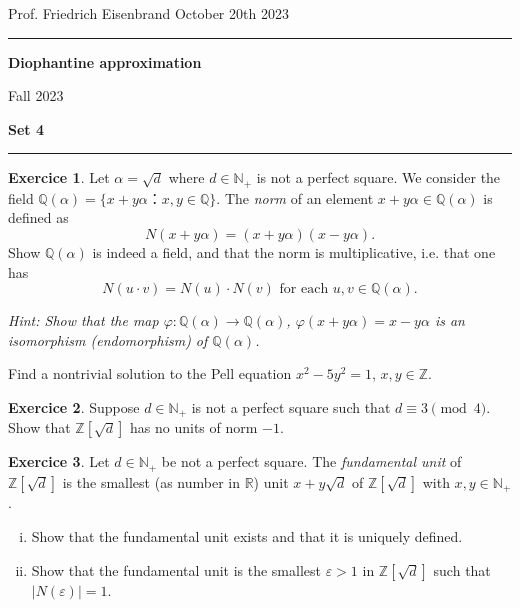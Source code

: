 \documentclass[12pt,a4paper]{article}
\date{}
\theoremstyle{plain}
\newtheorem*{Sol*}{Solution}
\theoremstyle{definition}
\newtheorem{Ex}{Exercice}
\def \Q {\mathbb Q}
\newif\ifsolutions
\newcommand{\exercise}[2]{
			\begin{Ex} #1 \end{Ex}
			\ifsolutions  \begin{Sol*} #2 \end{Sol*} \bigskip \else \bigskip  \fi
		}
\begin{document}
\begin{center}
{Prof. Friedrich Eisenbrand \hfill October 20th 2023}
\end{center}
	
\hrule\vspace{\baselineskip}

\begin{center}
\textbf{Diophantine approximation}

Fall 2023

\bigskip

\textbf{Set 4}
\ifsolutions{\textbf{- Solutions}} \else{} \fi
\end{center}

\hrule\vspace{\baselineskip}



\exercise{ Let $α = \sqrt{d}$ where $d ∈ ℕ_+$ is not a perfect square. We consider the field $ℚ(α) = \{ x + y α ： x, y ∈ℚ \}$.  The \emph{norm} of an element $x +  y α ∈ ℚ(α)$ is defined as
  \begin{displaymath}
    N(x +  y α) = (x +  y α)(x -  y α). 
  \end{displaymath}
  Show $\Q(\alpha)$ is indeed a field, and that the norm is multiplicative, i.e. that one has
  \begin{displaymath}
    N(u⋅v) = N(u)⋅N(v) \text{ for each } u,v ∈ℚ(α). 
  \end{displaymath}

{\bigskip \noindent  \small \emph{ Hint: Show that the map $φ: ℚ(α) → ℚ(α)$, $φ( x + y α ) =  x - y α $ is an isomorphism (endomorphism) of $ℚ(α)$.} }
}


\exercise{Find a nontrivial  solution to the Pell equation $x^2 - 5 y^2 =1$, $x,y ∈ ℤ$.}{}

\exercise{Suppose $d ∈ℕ_+$ is not a perfect square such that $d ≡ 3 \pmod{4}$. Show that $ℤ[\sqrt{d}]$ has no units of norm $-1$. }{}


\exercise{Let $d ∈ ℕ_+$ be not a perfect square. The \emph{fundamental unit} of $ℤ[\sqrt{d}]$ is the smallest (as number in $ℝ$) unit $x + y \sqrt{d}$ of $ℤ[\sqrt{d}]$ with $x,y ∈ℕ_+$.

\bigskip 

\noindent
\begin{enumerate}[i)]
\item 
  Show that the fundamental unit exists and that it is uniquely defined.
\item Show that the fundamental unit is the smallest $ε>1$ in $ℤ[\sqrt{d}]$ such that $|N(ε)| =  1$. 
\end{enumerate}
}{}
\end{document}

